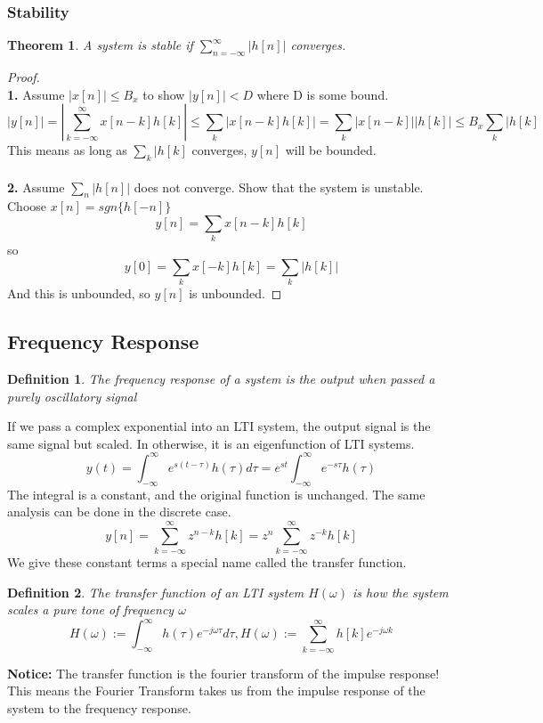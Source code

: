 \documentclass{article}
\newtheorem{theorem}{Theorem}
\newtheorem{definition}{Definition}
\newtheorem{proof}{Proof}
\begin{document}
\subsubsection{Stability}
\begin{theorem}
    A system is stable if $\sum_{n=-\infty}^{\infty}{|h[n]|}$ converges.
\end{theorem}
\begin{proof}
    \textbf{\\1. } Assume $|x[n]| \le B_x$ to show $|y[n]| < D$ where D is some bound.
    $$|y[n]| = |\sum_{k=-\infty}^{\infty}{x[n-k]h[k]}| \le \sum_{k}{|x[n-k]h[k]|} = \sum_{k}{|x[n-k]||h[k]|}\le B_x\sum_{k}{|h[k]}$$
    This means as long as $\sum_{k}{|h[k]}$ converges, $y[n]$ will be bounded.\\
    \textbf{\\2. } Assume $\sum_{n}{|h[n]|}$ does not converge. Show that the system is unstable.
    Choose $x[n]=sgn\{h[-n]\}$
    $$y[n]=\sum_{k}{x[n-k]h[k]}$$ so 
    $$y[0] = \sum_{k}{x[-k]h[k]} = \sum_{k}{|h[k]|}$$
    And this is unbounded, so $y[n]$ is unbounded.
\end{proof}
\subsection{Frequency Response}
\begin{definition}
    The frequency response of a system is the output when passed a purely oscillatory signal
\end{definition}
If we pass a complex exponential into an LTI system, the output signal is the same signal but scaled.
In otherwise, it is an eigenfunction of LTI systems.
$$y(t)=\int_{-\infty}^{\infty}{e^{s(t-\tau)}h(\tau)d\tau}=e^{st}\int_{-\infty}^{\infty}{e^{-s\tau}h(\tau)}$$
The integral is a constant, and the original function is unchanged.
The same analysis can be done in the discrete case.
$$y[n]=\sum_{k=-\infty}^{\infty}z^{n-k}h[k] = z^n \sum_{k=-\infty}^{\infty}z^{-k}h[k]$$
We give these constant terms a special name called the transfer function.
\begin{definition}
    The transfer function of an LTI system $H(\omega)$ is how the system scales a pure tone of frequency $\omega$
    $$H(\omega):=\int_{-\infty}^{\infty}{h(\tau)e^{-j\omega\tau}d\tau}, H(\omega):= \sum_{k=-\infty}^{\infty}{h[k]e^{-j\omega k}}$$
\end{definition}
\textbf{Notice: }The transfer function is the fourier transform of the impulse response!
This means the Fourier Transform takes us from the impulse response of the system to the frequency response. 
\end{document}
